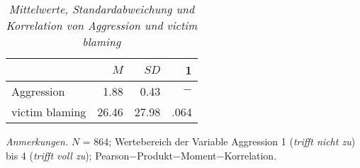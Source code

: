 \begin{table}[htb]
    \caption[Mittelwerte, Standardabweichung und Korrelation von Aggression und victim blaming]{\textit {Mittelwerte, Standardabweichung und Korrelation von Aggression und victim blaming}} 
    \label{H1_Spearman}
    \centering
    \begin{adjustbox}{width=6.5cm} %
    \small
    \begin{tabular}{lrrr}
      \hline
        & $M$   & $SD$ & 1 \\
      \hline
    Aggression      & 1.88  & 0.43   & $-$      \\
    victim blaming  & 26.46 & 27.98  & .064      \\
       \hline
    \end{tabular}
    \end{adjustbox}
    
    \begin{tablenotes}
        \item \textit{Anmerkungen.} \( N \) = 864; Wertebereich der Variable Aggression 1 (\textit{trifft nicht zu}) bis 4 (\textit{trifft voll zu}); Pearson$-$Produkt$-$Moment$-$Korrelation.
      \end{tablenotes}
    \end{table}

